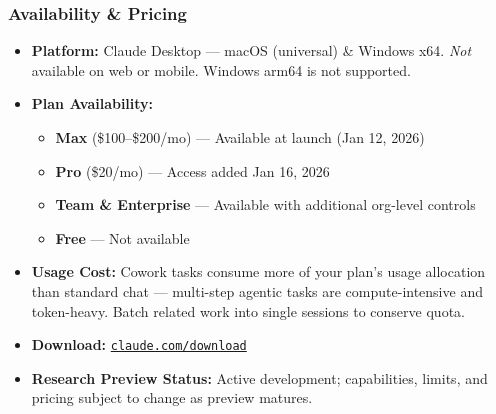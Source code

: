 \begin{frame}[fragile]\frametitle{Availability \& Pricing}
  \begin{itemize}
    \item \textbf{Platform:} Claude Desktop — macOS (universal) \& Windows x64. \textit{Not} available on web or mobile. Windows arm64 is not supported.
    \item \textbf{Plan Availability:}
      \begin{itemize}
        \item \textbf{Max} (\$100–\$200/mo) — Available at launch (Jan 12, 2026)
        \item \textbf{Pro} (\$20/mo) — Access added Jan 16, 2026
        \item \textbf{Team \& Enterprise} — Available with additional org-level controls
        \item \textbf{Free} — Not available
      \end{itemize}
    \item \textbf{Usage Cost:} Cowork tasks consume more of your plan's usage allocation than standard chat — multi-step agentic tasks are compute-intensive and token-heavy. Batch related work into single sessions to conserve quota.
    \item \textbf{Download:} \href{https://claude.com/download}{\texttt{claude.com/download}}
    \item \textbf{Research Preview Status:} Active development; capabilities, limits, and pricing subject to change as preview matures.
  \end{itemize}
\end{frame}


